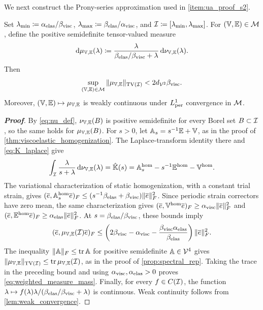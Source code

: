 {\color{blue}
We next construct the Prony-series approximation used in \ref{item:ua_proof_s2}.

\begin{lemma}\label{lem:weighted_spectral_measure}
Set $\lambda_{\min}\coloneqq\alpha_{\rm elas}/\beta_{\rm visc}$, $\lambda_{\max}\coloneqq\beta_{\rm elas}/\alpha_{\rm visc}$, and ${\mathcal{I}}\coloneqq[\lambda_{\min},\lambda_{\max}]$. For $(\mathbb{V},\mathbb{E})\in{\mathcal{M}}$, define the positive semidefinite tensor-valued measure
\begin{equation}\label{eq:weighted_measure_def}
\mathrm d\mu_{\mathbb{V},\mathbb{E}}(\lambda)\coloneqq\frac{\lambda}{\beta_{\rm elas}/\beta_{\rm visc}+\lambda}\,\mathrm d\nu_{\mathbb{V},\mathbb{E}}(\lambda).
\end{equation}
Then
\begin{equation}\label{eq:weighted_measure_mass}
\sup_{(\mathbb{V},\mathbb{E})\in{\mathcal{M}}}\|\mu_{\mathbb{V},\mathbb{E}}\|_{\mathrm{TV}({\mathcal{I}})}<2d_{{\mathcal{V}}^2}\beta_{\rm visc}.
\end{equation}
Moreover, $(\mathbb{V},\mathbb{E})\mapsto\mu_{\mathbb{V},\mathbb{E}}$ is weakly continuous under $L^1_{\rm per}$ convergence in ${\mathcal{M}}$.
\end{lemma}

\begin{proof}[\bf Proof]
By \cref{eq:nu_def}, $\nu_{\mathbb{V},\mathbb{E}}(B)$ is positive semidefinite for every Borel set $B\subset{\mathcal{I}}$, so the same holds for $\mu_{\mathbb{V},\mathbb{E}}(B)$. For $s>0$, let $\mathbb{A}_s=s^{-1}\mathbb{E}+\mathbb{V}$, as in the proof of \cref{thm:viscoelastic_homogenization}. The Laplace-transform identity there and \cref{eq:K_laplace} give
\begin{equation*}
\int_{{\mathcal{I}}}\frac{\lambda}{s+\lambda}\,\mathrm d\nu_{\mathbb{V},\mathbb{E}}(\lambda)
=\hat{\mathbb{K}}(s)=\mathbb{A}_s^{\rm hom}-s^{-1}\mathbb{E}^{\rm hom}-\mathbb{V}^{\rm hom}.
\end{equation*}
The variational characterization of static homogenization, with a constant trial strain, gives $(\overline e,\mathbb{A}_s^{\rm hom}\overline e)_F\le(s^{-1}\beta_{\rm elas}+\beta_{\rm visc})\|\overline e\|_F^2$. Since periodic strain correctors have zero mean, the same characterization gives $(\overline e,\mathbb{V}^{\rm hom}\overline e)_F\ge\alpha_{\rm visc}\|\overline e\|_F^2$ and $(\overline e,\mathbb{E}^{\rm hom}\overline e)_F\ge\alpha_{\rm elas}\|\overline e\|_F^2$. At $s=\beta_{\rm elas}/\beta_{\rm visc}$, these bounds imply
\begin{equation*}
(\overline e,\mu_{\mathbb{V},\mathbb{E}}({\mathcal{I}})\overline e)_F\le\left(2\beta_{\rm visc}-\alpha_{\rm visc}-\frac{\beta_{\rm visc}\alpha_{\rm elas}}{\beta_{\rm elas}}\right)\|\overline e\|_F^2.
\end{equation*}
The inequality $\|\mathbb{A}\|_F\le\operatorname{tr}\mathbb{A}$ for positive semidefinite $\mathbb{A}\in{\mathcal{V}}^4$ gives $\|\mu_{\mathbb{V},\mathbb{E}}\|_{\mathrm{TV}({\mathcal{I}})}\le\operatorname{tr}\mu_{\mathbb{V},\mathbb{E}}({\mathcal{I}})$, as in the proof of \cref{prop:spectral_rep}. Taking the trace in the preceding bound and using $\alpha_{\rm visc},\alpha_{\rm elas}>0$ proves \cref{eq:weighted_measure_mass}. Finally, for every $f\in C({\mathcal{I}})$, the function $\lambda\mapsto f(\lambda)\lambda/(\beta_{\rm elas}/\beta_{\rm visc}+\lambda)$ is continuous. Weak continuity follows from \cref{lem:weak_convergence}.
\end{proof}

}

